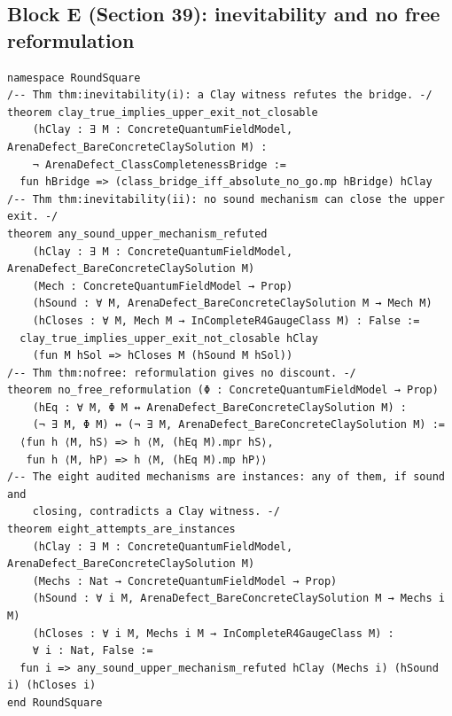 \documentclass[11pt,a4paper]{article}
\theoremstyle{plain}
\theoremstyle{definition}
\theoremstyle{remark}
\renewcommand{\_}{\oldunderscore\allowbreak}
\begin{document}
\subsection{Block E (Section 39): inevitability and no free reformulation}
\begin{lstlisting}
namespace RoundSquare
/-- Thm thm:inevitability(i): a Clay witness refutes the bridge. -/
theorem clay_true_implies_upper_exit_not_closable
    (hClay : ∃ M : ConcreteQuantumFieldModel, ArenaDefect_BareConcreteClaySolution M) :
    ¬ ArenaDefect_ClassCompletenessBridge :=
  fun hBridge => (class_bridge_iff_absolute_no_go.mp hBridge) hClay
/-- Thm thm:inevitability(ii): no sound mechanism can close the upper exit. -/
theorem any_sound_upper_mechanism_refuted
    (hClay : ∃ M : ConcreteQuantumFieldModel, ArenaDefect_BareConcreteClaySolution M)
    (Mech : ConcreteQuantumFieldModel → Prop)
    (hSound : ∀ M, ArenaDefect_BareConcreteClaySolution M → Mech M)
    (hCloses : ∀ M, Mech M → InCompleteR4GaugeClass M) : False :=
  clay_true_implies_upper_exit_not_closable hClay
    (fun M hSol => hCloses M (hSound M hSol))
/-- Thm thm:nofree: reformulation gives no discount. -/
theorem no_free_reformulation (Φ : ConcreteQuantumFieldModel → Prop)
    (hEq : ∀ M, Φ M ↔ ArenaDefect_BareConcreteClaySolution M) :
    (¬ ∃ M, Φ M) ↔ (¬ ∃ M, ArenaDefect_BareConcreteClaySolution M) :=
  ⟨fun h ⟨M, hS⟩ => h ⟨M, (hEq M).mpr hS⟩,
   fun h ⟨M, hP⟩ => h ⟨M, (hEq M).mp hP⟩⟩
/-- The eight audited mechanisms are instances: any of them, if sound and
    closing, contradicts a Clay witness. -/
theorem eight_attempts_are_instances
    (hClay : ∃ M : ConcreteQuantumFieldModel, ArenaDefect_BareConcreteClaySolution M)
    (Mechs : Nat → ConcreteQuantumFieldModel → Prop)
    (hSound : ∀ i M, ArenaDefect_BareConcreteClaySolution M → Mechs i M)
    (hCloses : ∀ i M, Mechs i M → InCompleteR4GaugeClass M) :
    ∀ i : Nat, False :=
  fun i => any_sound_upper_mechanism_refuted hClay (Mechs i) (hSound i) (hCloses i)
end RoundSquare
\end{lstlisting}
\end{document}
